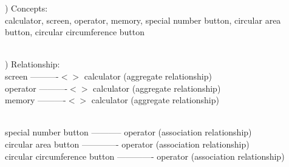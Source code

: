 \begin{flushleft} 

\vspace{5pt}
)	Concepts:\\
calculator, screen, operator, memory, special number button, circular area button, circular circumference button

\vspace{8pt}
\\
)	Relationship:\\
screen ----------$<$$>$ calculator (aggregate relationship)
\\
operator ----------$<$$>$ calculator (aggregate relationship)
\\
memory ----------$<$$>$ calculator (aggregate relationship)

\\
special number button ----------- operator (association relationship)
\\
circular area button ------------- operator (association relationship)
\\
circular circumference button ------------- operator (association relationship)


\end{flushleft}